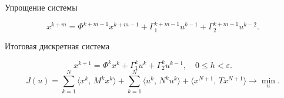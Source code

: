         \begin{frame}[t]{Упрощение системы}
                \centering
                

                \vspace{0.3cm}

                \begin{equation*}
                        x^{k+m}
                        =
                        \Phi^{k+m-1} x^{k+m-1} + \Gamma_1^{k+m-1}u^{k-1} + \Gamma_2^{k+m-1}u^{k-2}.
                \end{equation*}
        \end{frame}
        \begin{frame}[t]{Итоговая дискретная система}
                \centering
                
                \begin{equation*}
                        x^{k+1}
                        =
                        \Phi^k x^k + \Gamma_1^k u^{k} + \Gamma_2^k u^{k-1},
                        \quad
                        0 \leqslant h < \varepsilon.
                \end{equation*}
                \begin{equation*}
                        J(u)
                        =
                        \sum_{k=1}^{N}\langle x^k,\,M^k x^k \rangle
                        +
                        \sum_{k=1}^{N}\langle u^k,\,N^k u^k \rangle
                        +
                        \langle x^{N+1},\,T x^{N+1} \rangle
                        \longrightarrow \min\limits_{u}.
                \end{equation*}
        \end{frame}

